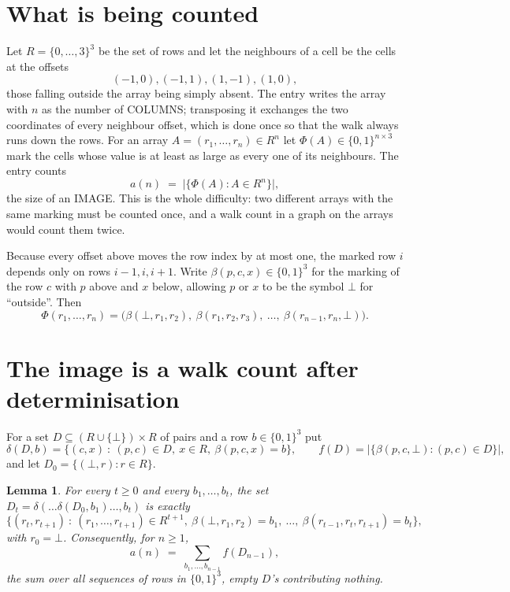 \documentclass[11pt,a4paper]{article}
\theoremstyle{plain}
\newtheorem{lemma}[theorem]{Lemma}
\theoremstyle{definition}
\begin{document}
\section{What is being counted}

Let $R=\{0,\dots,3\}^{3}$ be the set of rows and let the neighbours of a cell be the
cells at the offsets
\[
(-1,0), (-1,1), (1,-1), (1,0),
\]
those falling outside the array being simply absent. The entry writes the array with $n$ as the number of COLUMNS; transposing it exchanges the two coordinates of every neighbour offset, which is done once so that the walk always runs down the rows. For an array
$A=(r_1,\dots,r_n)\in R^n$ let $\Phi(A)\in\{0,1\}^{n\times3}$ mark the cells whose value
is at least as large as every one of its neighbours. The entry counts
\[
a(n)\;=\;\bigl|\{\Phi(A):A\in R^n\}\bigr| ,
\]
the size of an IMAGE. This is the whole difficulty: two different arrays with the same marking
must be counted once, and a walk count in a graph on the arrays would count them twice.

Because every offset above moves the row index by at most one, the marked row $i$ depends only
on rows $i-1,i,i+1$. Write $\beta(p,c,x)\in\{0,1\}^{3}$ for the marking of the row $c$
with $p$ above and $x$ below, allowing $p$ or $x$ to be the symbol $\bot$ for ``outside''.
Then
\[
\Phi(r_1,\dots,r_n)=\bigl(\beta(\bot,r_1,r_2),\ \beta(r_1,r_2,r_3),\ \dots,\
\beta(r_{n-1},r_n,\bot)\bigr).
\]

\section{The image is a walk count after determinisation}

For a set $D\subseteq(R\cup\{\bot\})\times R$ of pairs and a row $b\in\{0,1\}^{3}$ put
\[
\delta(D,b)=\{(c,x)\ :\ (p,c)\in D,\ x\in R,\ \beta(p,c,x)=b\},\qquad
f(D)=\bigl|\{\beta(p,c,\bot):(p,c)\in D\}\bigr| ,
\]
and let $D_0=\{(\bot,r):r\in R\}$.

\begin{lemma}\label{lem:det}
For every $t\ge0$ and every $b_1,\dots,b_t$, the set
$D_t=\delta(\dots\delta(D_0,b_1)\dots,b_t)$ is exactly
\[
\{(r_t,r_{t+1})\ :\ (r_1,\dots,r_{t+1})\in R^{t+1},\ \beta(\bot,r_1,r_2)=b_1,\ \dots,\
\beta(r_{t-1},r_t,r_{t+1})=b_t\} ,
\]
with $r_0=\bot$. Consequently, for $n\ge1$,
\[
a(n)\;=\;\sum_{b_1,\dots,b_{n-1}}f(D_{n-1}),
\]
the sum over all sequences of rows in $\{0,1\}^{3}$, empty $D$'s contributing nothing.
\end{lemma}
\end{document}
